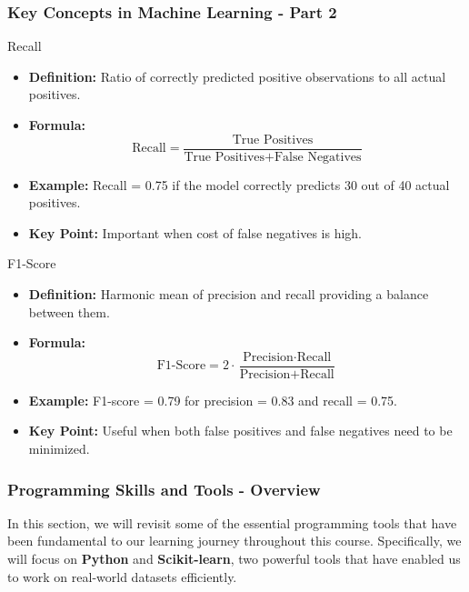 \documentclass[aspectratio=169]{beamer}
\begin{document}
\begin{frame}[fragile]
    \frametitle{Key Concepts in Machine Learning - Part 2}
    
    \begin{block}{Recall}
        \begin{itemize}
            \item \textbf{Definition:} Ratio of correctly predicted positive observations to all actual positives.
            \item \textbf{Formula:} 
            \begin{equation}
                \text{Recall} = \frac{\text{True Positives}}{\text{True Positives} + \text{False Negatives}}
            \end{equation}
            \item \textbf{Example:} Recall = 0.75 if the model correctly predicts 30 out of 40 actual positives.
            \item \textbf{Key Point:} Important when cost of false negatives is high.
        \end{itemize}
    \end{block}
    
    \vspace{1cm}
    
    \begin{block}{F1-Score}
        \begin{itemize}
            \item \textbf{Definition:} Harmonic mean of precision and recall providing a balance between them.
            \item \textbf{Formula:}  
            \begin{equation}
                \text{F1-Score} = 2 \cdot \frac{\text{Precision} \cdot \text{Recall}}{\text{Precision} + \text{Recall}}
            \end{equation}
            \item \textbf{Example:} F1-score = 0.79 for precision = 0.83 and recall = 0.75.
            \item \textbf{Key Point:} Useful when both false positives and false negatives need to be minimized.
        \end{itemize}
    \end{block}
\end{frame}

\begin{frame}[fragile]
    \frametitle{Programming Skills and Tools - Overview}
    In this section, we will revisit some of the essential programming tools that have been fundamental to our learning journey throughout this course. 
    Specifically, we will focus on \textbf{Python} and \textbf{Scikit-learn}, two powerful tools that have enabled us to work on real-world datasets efficiently.
\end{frame}
\end{document}
